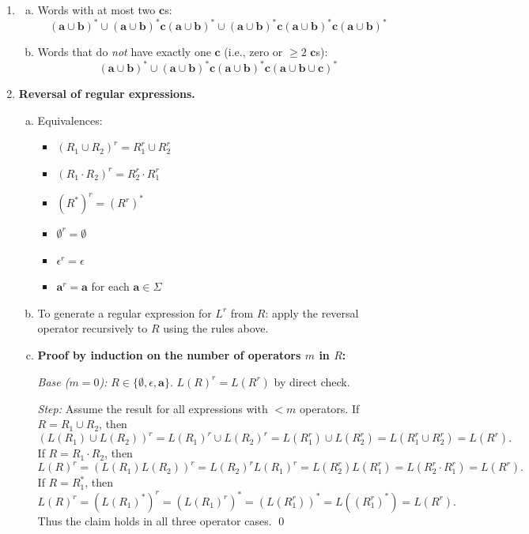 \begin{enumerate}[{6.}1.]
\item \begin{enumerate}[(a)]
  \item Words with at most two $\pmb{c}$s:
  \[
    (\pmb{a}\cup\pmb{b})^*\cup(\pmb{a}\cup\pmb{b})^*\pmb{c}(\pmb{a}\cup\pmb{b})^*\cup(\pmb{a}\cup\pmb{b})^*\pmb{c}(\pmb{a}\cup\pmb{b})^*\pmb{c}(\pmb{a}\cup\pmb{b})^*
  \]

  \item Words that do \emph{not} have exactly one $\pmb{c}$ (i.e., zero or $\ge 2$ $\pmb{c}$s):
  \[
    (\pmb{a}\cup\pmb{b})^*
    \cup
    (\pmb{a}\cup\pmb{b})^*\pmb{c}(\pmb{a}\cup\pmb{b})^*\pmb{c}(\pmb{a}\cup\pmb{b}\cup\pmb{c})^*
  \]
\end{enumerate}

\item \textbf{Reversal of regular expressions.}

\begin{enumerate}[(a)]
  \item Equivalences:
  \begin{itemize}
    \item $(R_1\cup R_2)^r=R_1^r\cup R_2^r$
    \item $(R_1\cdot R_2)^r=R_2^r\cdot R_1^r$
    \item $(R^*)^r=(R^r)^*$
    \item $\emptyset^r=\emptyset$
    \item $\epsilon^r=\epsilon$
    \item $\pmb{a}^r=\pmb{a}$ for each $\pmb{a}\in\Sigma$
  \end{itemize}

  \item To generate a regular expression for $L^r$ from $R$: apply the reversal operator recursively to $R$ using the rules above.

  \item \textbf{Proof by induction on the number of operators $m$ in $R$:}

  \emph{Base ($m=0$):}  $R\in\{\emptyset,\epsilon,\pmb{a}\}$.  $L(R)^r=L(R^r)$ by direct check.

  \emph{Step:}  Assume the result for all expressions with $<m$ operators.
  If $R=R_1\cup R_2$, then
  \[
  (L(R_1)\cup L(R_2))^r=L(R_1)^r\cup L(R_2)^r
  =L(R_1^r)\cup L(R_2^r)=L(R_1^r\cup R_2^r)=L(R^r).
  \]
  If $R=R_1\cdot R_2$, then
  \[
  L(R)^r=(L(R_1)L(R_2))^r=L(R_2)^rL(R_1)^r
  =L(R_2^r)L(R_1^r)=L(R_2^r\cdot R_1^r)=L(R^r).
  \]
  If $R=R_1^*$, then
  \[
  L(R)^r=(L(R_1)^*)^r=(L(R_1)^r)^*
  =(L(R_1^r))^*=L((R_1^r)^*)=L(R^r).
  \]
  Thus the claim holds in all three operator cases.  \qed


\end{enumerate}
\end{enumerate}
